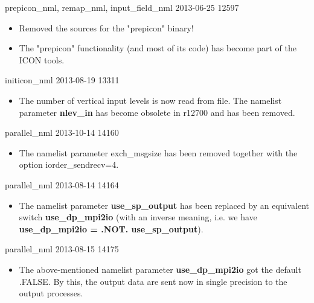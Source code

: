 \begin{changeitem}{prepicon\_nml, remap\_nml, input\_field\_nml}{ 2013-06-25 }{ 12597 }
  \begin{itemize}
   \item Removed the sources for the "prepicon" binary!
   \item The "prepicon" functionality (and most of its code) has become part of the ICON tools.
  \end{itemize}
\end{changeitem}

\begin{changeitem}{initicon\_nml}{ 2013-08-19 }{ 13311 }
  \begin{itemize}
   \item The number of vertical input levels is now read from file.
         The namelist parameter \textbf{nlev\_in} has become obsolete in r12700 and has been removed.
  \end{itemize}
\end{changeitem}

\begin{changeitem}{parallel\_nml}{ 2013-10-14 }{ 14160 }
  \begin{itemize}
   \item The namelist parameter exch\_msgsize has been removed together with the option iorder\_sendrecv=4.
  \end{itemize}
\end{changeitem}

\begin{changeitem}{parallel\_nml}{ 2013-08-14 }{ 14164 }
  \begin{itemize}
   \item The namelist parameter \textbf{use\_sp\_output} has been replaced by an equivalent switch \textbf{use\_dp\_mpi2io}
         (with an inverse meaning, i.e. we have \textbf{use\_dp\_mpi2io = .NOT. use\_sp\_output}).
  \end{itemize}
\end{changeitem}

\begin{changeitem}{parallel\_nml}{ 2013-08-15 }{ 14175 }
  \begin{itemize}
   \item The above-mentioned namelist parameter \textbf{use\_dp\_mpi2io} got the default
         .FALSE. By this, the output data are sent now in single precision to the output processes.
  \end{itemize}
\end{changeitem}

